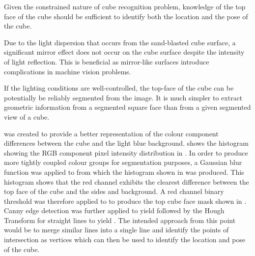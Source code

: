 \begin{compactitem}
    \item Given the constrained nature of cube recognition problem, knowledge of the top face of the cube should be sufficient to identify both the location and the pose of the cube.
    \item Due to the light dispersion that occurs from the sand-blasted cube surface, a significant mirror effect does not occur on the cube surface despite the intensity of light reflection. This is beneficial as mirror-like surfaces introduce complications in machine vision problems.
    \item If the lighting conditions are well-controlled, the top-face of the cube can be potentially be reliably segmented from the image. It is much simpler to extract geometric information from a segmented square face than from a given segmented view of a cube.
\end{compactitem}

 was created to provide a better representation of the colour component differences between the cube and the light blue background.  shows the histogram showing the RGB component pixel intensity distribution in . In order to produce more tightly coupled colour groups for segmentation purposes, a Gaussian blur function was applied to  from which the histogram shown in  was produced. This histogram shows that the red channel exhibits the clearest difference between the top face of the cube and the sides and background. A red channel binary threshold was therefore applied to  to produce the top cube face mask shown in . Canny edge detection was further applied to yield  followed by the Hough Transform for straight lines to yield . The intended approach from this point would be to merge similar lines into a single line and identify the points of intersection as vertices which can then be used to identify the location and pose of the cube.


